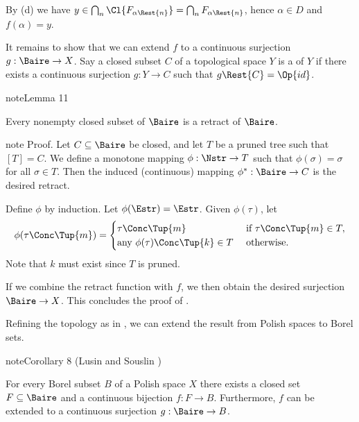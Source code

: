 \documentclass[letterpaper,10pt,english]{jupyterBook}
\begin{document}
\sphinxAtStartPar
By (d) we have \(y \in \bigcap_n \Cl{F_{\alpha\Rest{n}}} = \bigcap_n F_{\alpha\Rest{n}}\), hence \(\alpha \in D\) and \(f(\alpha) = y\).

\sphinxAtStartPar
It remains to show that we can extend \(f\) to a continuous surjection \(g: \Baire \to X\). Say a closed subset \(C\) of a topological space \(Y\) is a  of \(Y\) if there exists a continuous surjection \(g: Y \to C\) such that \(g\Rest{C} = \Op{id}\).
\label{imagesBorel:lem-closed-retract-Baire}
\begin{sphinxadmonition}{note}{Lemma 11}



\sphinxAtStartPar
Every non\sphinxhyphen{}empty closed subset of \(\Baire\) is a retract of \(\Baire\).
\end{sphinxadmonition}

\begin{sphinxadmonition}{note}
\sphinxAtStartPar
Proof. Let \(C \subseteq \Baire\) be closed, and let \(T\) be a pruned tree such that \([T] = C\). We define a monotone mapping \(\phi:\Nstr \to T\) such that \(\phi(\sigma) = \sigma\) for all \(\sigma \in T\). Then the induced (continuous) mapping \(\phi^*: \Baire \to C\) is the desired retract.

\sphinxAtStartPar
Define \(\phi\) by induction. Let \(\phi(\Estr) = \Estr\). Given \(\phi(\tau)\), let
\begin{equation*}
\begin{split}
    \phi(\tau\Conc\Tup{m}) = \begin{cases}
        \tau\Conc\Tup{m} & \text{ if } \tau\Conc\Tup{m} \in T,\\
        \text{any } \phi(\tau)\Conc\Tup{k} \in T & \text{ otherwise}.
    \end{cases}
\end{split}
\end{equation*}
\sphinxAtStartPar
Note that \(k\) must exist since \(T\) is pruned.
\end{sphinxadmonition}

\sphinxAtStartPar
If we combine the retract function with \(f\), we then obtain the desired surjection \(\Baire \to X\). This concludes the proof of {\hyperref[\detokenize{imagesBorel:thm-Polish-bijection-Baire}]{}}.

\sphinxAtStartPar
Refining the topology as in {\hyperref[\detokenize{subsets_Polish:thm-Borel-clopen}]{}}, we can extend the result from Polish spaces to Borel sets.
\label{imagesBorel:cor-Borel-image-closed}
\begin{sphinxadmonition}{note}{Corollary 8 (Lusin and Souslin  )}



\sphinxAtStartPar
For every Borel subset \(B\) of a Polish space \(X\) there exists a closed set \(F \subseteq \Baire\) and a continuous bijection \(f:F \to B\). Furthermore, \(f\) can be extended to a continuous surjection \(g:\Baire \to B\).
\end{sphinxadmonition}
\end{document}
